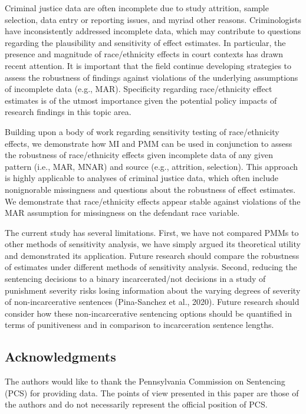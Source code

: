\documentclass[
  letterpaper,
  DIV=11,
  numbers=noendperiod]{scrartcl}
\begin{document}
Criminal justice data are often incomplete due to study attrition,
sample selection, data entry or reporting issues, and myriad other
reasons. Criminologists have inconsistently addressed incomplete data,
which may contribute to questions regarding the plausibility and
sensitivity of effect estimates. In particular, the presence and
magnitude of race/ethnicity effects in court contexts has drawn recent
attention. It is important that the field continue developing strategies
to assess the robustness of findings against violations of the
underlying assumptions of incomplete data (e.g., MAR). Specificity
regarding race/ethnicity effect estimates is of the utmost importance
given the potential policy impacts of research findings in this topic
area.

Building upon a body of work regarding sensitivity testing of
race/ethnicity effects, we demonstrate how MI and PMM can be used in
conjunction to assess the robustness of race/ethnicity effects given
incomplete data of any given pattern (i.e., MAR, MNAR) and source (e.g.,
attrition, selection). This approach is highly applicable to analyses of
criminal justice data, which often include nonignorable missingness and
questions about the robustness of effect estimates. We demonstrate that
race/ethnicity effects appear stable against violations of the MAR
assumption for missingness on the defendant race variable.

The current study has several limitations. First, we have not compared
PMMs to other methods of sensitivity analysis, we have simply argued its
theoretical utility and demonstrated its application. Future research
should compare the robustness of estimates under different methods of
sensitivity analysis. Second, reducing the sentencing decisions to a
binary incarcerated/not decisions in a study of punishment severity
risks losing information about the varying degrees of severity of
non-incarcerative sentences (Pina-Sanchez et al., 2020). Future research
should consider how these non-incarcerative sentencing options should be
quantified in terms of punitiveness and in comparison to incarceration
sentence lengths.

\hypertarget{acknowledgments}{%
\subsection{Acknowledgments}\label{acknowledgments}}

The authors would like to thank the Pennsylvania Commission on
Sentencing (PCS) for providing data. The points of view presented in
this paper are those of the authors and do not necessarily represent the
official position of PCS.
\end{document}
